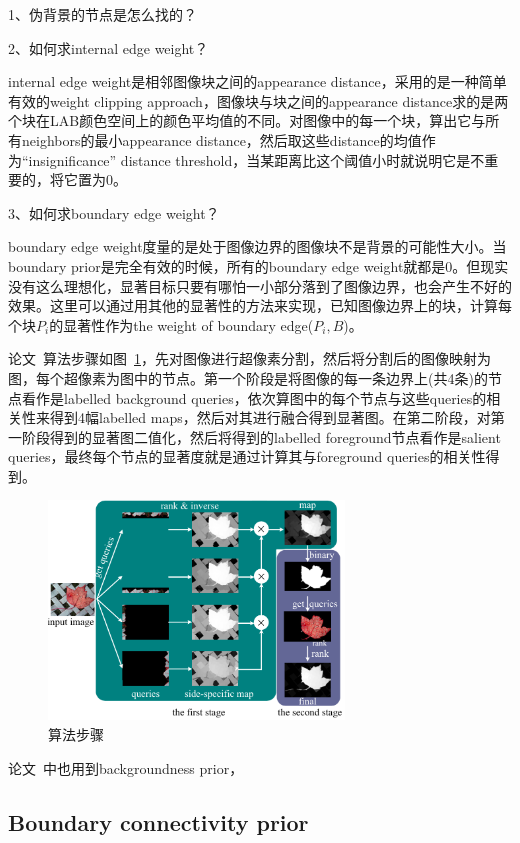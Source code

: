 \documentclass[12pt]{article}
\begin{document}
1、伪背景的节点是怎么找的？

2、如何求internal edge weight？

internal edge weight是相邻图像块之间的appearance distance，采用的是一种简单有效的weight clipping approach，图像块与块之间的appearance distance求的是两个块在LAB颜色空间上的颜色平均值的不同。对图像中的每一个块，算出它与所有neighbors的最小appearance distance，然后取这些distance的均值作为“insignificance” distance threshold，当某距离比这个阈值小时就说明它是不重要的，将它置为0。

3、如何求boundary edge weight？

boundary edge weight度量的是处于图像边界的图像块不是背景的可能性大小。当boundary prior是完全有效的时候，所有的boundary edge weight就都是0。但现实没有这么理想化，显著目标只要有哪怕一小部分落到了图像边界，也会产生不好的效果。这里可以通过用其他的显著性的方法来实现，已知图像边界上的块，计算每个块$P_i$的显著性作为the weight of boundary edge($P_i, B$)。

论文~\cite{yang2013saliency}算法步骤如图~\ref{fig: MR1}，先对图像进行超像素分割，然后将分割后的图像映射为图，每个超像素为图中的节点。第一个阶段是将图像的每一条边界上(共4条)的节点看作是labelled background queries，依次算图中的每个节点与这些queries的相关性来得到4幅labelled maps，然后对其进行融合得到显著图。在第二阶段，对第一阶段得到的显著图二值化，然后将得到的labelled foreground节点看作是salient queries，最终每个节点的显著度就是通过计算其与foreground queries的相关性得到。
\begin{figure}[!ht]
\centering
\includegraphics[width=0.7\textwidth]{MR1.png}
\caption{算法步骤}
\label{fig: MR1}
\end{figure}

论文~\cite{jiang2013saliency}中也用到backgroundness prior，

\subsection{Boundary connectivity prior}
\end{document}
